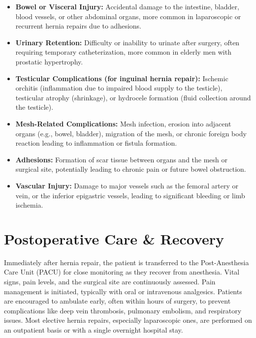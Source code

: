 \begin{itemize}
\begin{itemize}
    \item \textbf{Bowel or Visceral Injury:} Accidental damage to the intestine, bladder, blood vessels, or other abdominal organs, more common in laparoscopic or recurrent hernia repairs due to adhesions.
    
    \item \textbf{Urinary Retention:} Difficulty or inability to urinate after surgery, often requiring temporary catheterization, more common in elderly men with prostatic hypertrophy.
    
    \item \textbf{Testicular Complications (for inguinal hernia repair):} Ischemic orchitis (inflammation due to impaired blood supply to the testicle), testicular atrophy (shrinkage), or hydrocele formation (fluid collection around the testicle).
    
    \item \textbf{Mesh-Related Complications:} Mesh infection, erosion into adjacent organs (e.g., bowel, bladder), migration of the mesh, or chronic foreign body reaction leading to inflammation or fistula formation.
    
    \item \textbf{Adhesions:} Formation of scar tissue between organs and the mesh or surgical site, potentially leading to chronic pain or future bowel obstruction.
    
    \item \textbf{Vascular Injury:} Damage to major vessels such as the femoral artery or vein, or the inferior epigastric vessels, leading to significant bleeding or limb ischemia.
  \end{itemize}
\end{itemize}

\section*{Postoperative Care \& Recovery}
Immediately after hernia repair, the patient is transferred to the Post-Anesthesia Care Unit (PACU) for close monitoring as they recover from anesthesia. Vital signs, pain levels, and the surgical site are continuously assessed. Pain management is initiated, typically with oral or intravenous analgesics. Patients are encouraged to ambulate early, often within hours of surgery, to prevent complications like deep vein thrombosis, pulmonary embolism, and respiratory issues. Most elective hernia repairs, especially laparoscopic ones, are performed on an outpatient basis or with a single overnight hospital stay.

